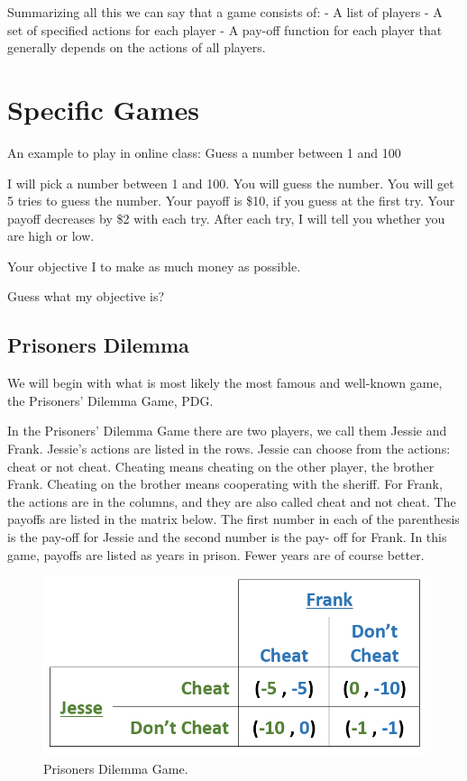\documentclass[
]{book}
\begin{document}
Summarizing all this we can say that a game consists of:
- A list of players
- A set of specified actions for each player
- A pay-off function for each player that generally depends on the actions of all players.

\hypertarget{specific-games}{%
\section{Specific Games}\label{specific-games}}

An example to play in online class: Guess a number between 1 and 100

I will pick a number between 1 and 100. You will guess the number. You will get 5 tries to guess the number. Your payoff is \$10, if you guess at the first try. Your payoff decreases by \$2 with each try. After each try, I will tell you whether you are high or low.

Your objective I to make as much money as possible.

Guess what my objective is?

\hypertarget{prisoners-dilemma}{%
\subsection{Prisoners Dilemma}\label{prisoners-dilemma}}

We will begin with what is most likely the most famous and well-known game, the
Prisoners' Dilemma Game, PDG.

In the Prisoners' Dilemma Game there are two players, we call them Jessie and Frank. Jessie's actions are listed in the rows. Jessie can choose from the actions: cheat or not cheat. Cheating means cheating on the other player, the brother Frank. Cheating on the brother means cooperating with the sheriff. For Frank, the actions are in the columns, and they are also called cheat and not cheat. The payoffs are listed in the matrix below. The first number in each of the parenthesis is the pay-off for Jessie and the second number is the pay- off for Frank. In this game, payoffs are listed as years in prison. Fewer years are of course better.

\begin{figure}

{\centering \includegraphics[width=0.5\linewidth]{img/ch7/fig1} 

}

\caption{Prisoners Dilemma Game.}\label{fig:fig701}
\end{figure}
\end{document}

